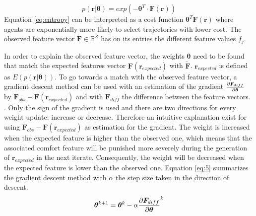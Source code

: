 \begin{equation}\label{eq:entropy}
	p(\bm{r}|\bm{\theta}) = exp(-\bm{\theta}^T\cdot \bm{F}(\bm{r}))
\end{equation}
Equation \ref{eq:entropy} can be interpreted as a cost function $\bm{\theta}^T\bm{F}(\bm{r})$ where agents are exponentially more likely to select trajectories with lower cost. \cite{Kuderer2015a}
The observed feature vector $\tilde{\bm{F}} \in \mathbb{R}^Z$ has on its entries the different feature values $\tilde{f_j}$. 


In order to explain the observed feature vector, the weights $\bm{\theta}$ need to be found that match the expected features vector $\bm{F}(\bm{r}_{expected})$ with $\tilde{\bm{F}}$. $\bm{r}_{expected}$ is defined as $ E(p(\bm{r}|\bm{\theta}))$. To go towards a match with the observed feature vector, a gradient descent method can be used with an estimation of the gradient $\pdv{\bm{F}_{diff}}{\bm{\theta}}$ by $\bm{F}_{obs} - \bm{F}(\bm{r}_{expected})$ and with $\bm{F}_{diff}$ the difference between the feature vectors. \cite{Ziebart2008, Kretzschmar2014}. Only the sign of the gradient is used and there are two directions for every weight update: increase or decrease. Therefore an intuitive explanation exist for using $\bm{F}_{obs} - \bm{F}(\bm{r}_{expected})$ as estimation for the gradient. The weight is increased when the expected feature is higher than the observed one, which means that the associated comfort feature will be punished more severely during the generation of $\bm{r}_{expected}$ in the next iterate. Consequently, the weight will be decreased when the expected feature is lower than the observed one. Equation \ref{eq:5} summarizes the gradient descent method with $\alpha$ the step size taken in the direction of descent.
\begin{equation}\label{eq:5}
	\bm{\theta}^{k+1} = \bm{\theta}^{k} - \alpha \pdv{\bm{F}_{diff}}{\bm{\theta}}^k 
\end{equation}

